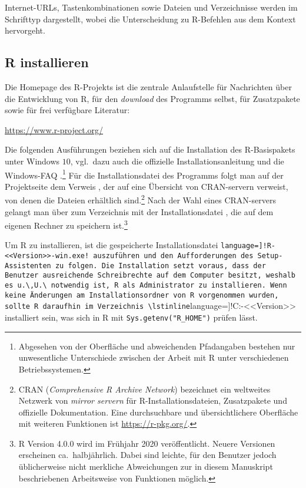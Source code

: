 Internet-URLs, Tastenkombinationen sowie Dateien und Verzeichnisse werden im Schrifttyp  dargestellt, wobei die Unterscheidung zu R-Befehlen aus dem Kontext hervorgeht.

\subsection{R installieren}

Die Homepage des R-Projekts ist die zentrale Anlaufstelle für Nachrichten über die Entwicklung von R, für den \emph{download} des Programms selbst, für Zusatzpakete sowie für frei verfügbare Literatur:

\url{https://www.r-project.org/}

Die folgenden Ausführungen beziehen sich auf die Installation des R-Basispakets unter Windows $10$, vgl.\ dazu auch die offizielle Installationsanleitung \cite{RDevelopmentCoreTeam2008a} und die Windows-FAQ \cite{Ripley2008}.\footnote{Abgesehen von der Oberfläche und abweichenden Pfadangaben bestehen nur unwesentliche Unterschiede zwischen der Arbeit mit R unter verschiedenen Betriebssystemen.} Für die Installationsdatei des Programms folgt man auf der Projektseite dem Verweis , der auf eine Übersicht von CRAN-servern verweist, von denen die Dateien erhältlich sind.\footnote{CRAN (\emph{Comprehensive R Archive Network}) bezeichnet ein weltweites Netzwerk von \emph{mirror servern} für R-Installationsdateien, Zusatzpakete und offizielle Dokumentation. Eine durchsuchbare und übersichtlichere Oberfläche mit weiteren Funktionen ist \url{https://r-pkg.org/}.} Nach der Wahl eines CRAN-servers gelangt man über  zum Verzeichnis mit der Installationsdatei , die auf dem eigenen Rechner zu speichern ist.\footnote{R Version 4.0.0 wird im Frühjahr 2020 veröffentlicht. Neuere Versionen erscheinen ca.\ halbjährlich. Dabei sind leichte, für den Benutzer jedoch üblicherweise nicht merkliche Abweichungen zur in diesem Manuskript beschriebenen Arbeitsweise von Funktionen möglich.}

Um R zu installieren, ist die gespeicherte Installationsdatei \lstinline[language=]!R-<<Version>>-win.exe! auszuführen und den Aufforderungen des Setup-Assistenten zu folgen. Die Installation setzt voraus, dass der Benutzer ausreichende Schreibrechte auf dem Computer besitzt, weshalb es u.\,U.\ notwendig ist, R als Administrator zu installieren. Wenn keine Änderungen am Installationsordner von R vorgenommen wurden, sollte R daraufhin im Verzeichnis \lstinline[language=]!C:\Programme\R-<<Version>>\! installiert sein, was sich in R mit \lstinline!Sys.getenv("R_HOME")! prüfen lässt.

